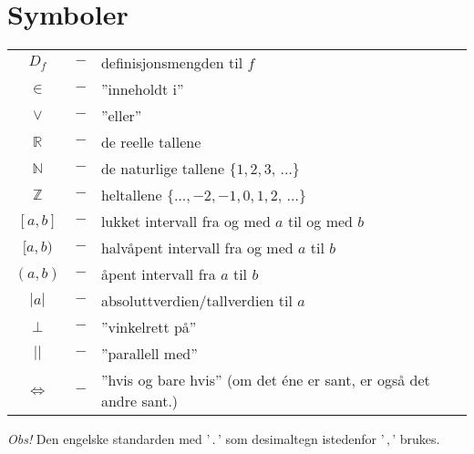 


\section*{Symboler}
\renewcommand{\arraystretch}{1.2}
\begin{tabular}{@{}cp{0.4cm}l}
$ D_f $ &$ - $& definisjonsmengden til $ f $	\\
$ \in $ &$ - $& ''inneholdt i'' \\
$ \vee $ &$ - $&''eller'' \\
$ \mathbb{R} $ &$ - $&de reelle tallene \\
$ \mathbb{N} $ &$ - $&de naturlige tallene $ \{1, 2, 3,\,...\} $ \\
$ \mathbb{Z} $ &$ - $&heltallene $ \{...,-2,-1, 0, 1, 2,\,...\} $ \\
$ [a, b] $ &$ - $& lukket intervall fra og med $ a $ til og med $ b $\\
$ [a, b) $ &$ - $& halvåpent intervall fra og med $ a $ til $ b $ \\
$ (a, b) $ &$ - $& åpent intervall fra $ a $ til $ b $ \\
$|a| $ &$ - $&  absoluttverdien/tallverdien til $ a $\\
$\perp $ &$ - $&  ''vinkelrett på'' \\
$|| $ &$ - $&  ''parallell med'' \\
$ \iff$ &$ - $& ''hvis og bare hvis'' (om det éne er sant, er også det andre sant.)
\end{tabular}
\renewcommand{\arraystretch}{1}

\textsl{Obs!} Den engelske standarden med '\,.\,' som desimaltegn istedenfor '\,,\,' brukes. 

